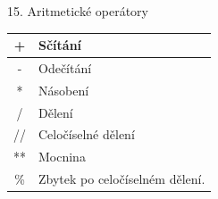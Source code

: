 \documentclass[czech]{beamer}
\providecommand{\tabularnewline}{\\}
\begin{document}
\begin{frame}[plain]{15. Aritmetické operátory}
{\scriptsize\par}\begin{center}
{\scriptsize{}%
\begin{tabular}{|c|>{\raggedright}p{5cm}|}
\hline 
{\scriptsize + } & {\scriptsize Sčítání}\tabularnewline
\hline 
{\scriptsize - } & {\scriptsize Odečítání}\tabularnewline
\hline 
{\scriptsize{*} } & {\scriptsize Násobení}\tabularnewline
\hline 
{\scriptsize / } & {\scriptsize Dělení}\tabularnewline
\hline 
{\scriptsize //} & {\scriptsize Celočíselné dělení}\tabularnewline
\hline 
{\scriptsize{*}{*}} & {\scriptsize Mocnina}\tabularnewline
\hline 
{\scriptsize\% } & {\scriptsize Zbytek po celočíselném dělení.}\tabularnewline
\hline 
\end{tabular}}{\scriptsize\par}
\par\end{center}

\end{frame}
\end{document}
